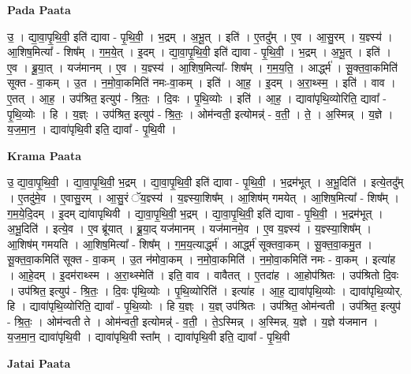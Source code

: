\documentclass[17pt]{extarticle}
\begin{document}
\textbf{Pada Paata} \newline

उ॒ । द्या॒वा॒पृ॒थि॒वी॒ इति॑ द्यावा - पृ॒थि॒वी॒ । भ॒द्रम् । अ॒भू॒त् । इति॑ । ए॒तदु᳚म् । ए॒व । आ॒सु॒रम् । य॒ज्ञ्स्य॑ । आ॒शिष॒मित्या᳚ - शिष᳚म् । ग॒म॒ये॒त् । इ॒दम् । द्या॒वा॒पृ॒थि॒वी॒ इति॑ द्यावा - पृ॒थि॒वी॒ । भ॒द्रम् । अ॒भू॒त् । इति॑ । ए॒व । ब्रू॒या॒त् । यज॑मानम् । ए॒व । य॒ज्ञ्स्य॑ । आ॒शिष॒मित्या᳚- शिष᳚म् । ग॒म॒य॒ति॒ । आर्द्ध्म॑ । सू॒क्त॒वा॒कमिति॑ सूक्त - वा॒कम् । उ॒त । न॒मो॒वा॒कमिति॑ नमः-वा॒कम् । इति॑ । आ॒ह॒ । इ॒दम् । अ॒रा॒थ्स्म॒ । इति॑ । वाव । ए॒तत् । आ॒ह॒ । उप॑श्रित॒ इत्युप॑ - श्रि॒तः॒ । दि॒वः । पृ॒थि॒व्योः । इति॑ । आ॒ह॒ । द्यावा॑पृथि॒व्योरिति॒ द्यावा᳚ - पृ॒थि॒व्योः । हि । य॒ज्ञ्ः । उप॑श्रित॒ इत्युप॑ - श्रि॒तः॒ । ओम॑न्वती॒ इत्योमन्न्॑ - व॒ती॒ । ते॒ । अ॒स्मिन्न् । य॒ज्ञे । य॒ज॒मा॒न॒ । द्यावा॑पृथि॒वी इति॒ द्यावा᳚ - पृ॒थि॒वी ।  \newline


\textbf{Krama Paata} \newline

उ॒ द्या॒वा॒पृ॒थि॒वी॒ । द्या॒वा॒पृ॒थि॒वी॒ भ॒द्रम् । द्या॒वा॒पृ॒थि॒वी॒ इति॑ द्यावा - पृ॒थि॒वी॒ । भ॒द्रम॑भूत् । अ॒भू॒दिति॑ । इत्ये॒तदु᳚म् । ए॒तदु॑मे॒व । ए॒वासु॒रम् । आ॒सु॒रं ॅय॒ज्ञ्स्य॑ । य॒ज्ञ्स्या॒शिष᳚म् । आ॒शिष॑म् गमयेत् । आ॒शिष॒मित्या᳚ - शिष᳚म् । ग॒म॒ये॒दि॒दम् । इ॒दम् द्या॑वापृथिवी । द्या॒वा॒पृ॒थि॒वी॒ भ॒द्रम् । द्या॒वा॒पृ॒थि॒वी॒ इति॑ द्यावा - पृ॒थि॒वी॒ । भ॒द्रम॑भूत् । अ॒भू॒दिति॑ । इत्ये॒व । ए॒व ब्रू॑यात् । ब्रू॒या॒द् यज॑मानम् । यज॑मानमे॒व । ए॒व य॒ज्ञ्स्य॑ । य॒ज्ञ्स्या॒शिष᳚म् । आ॒शिष॑म् गमयति । आ॒शिष॒मित्या᳚ - शिष᳚म् । ग॒म॒य॒त्यार्द्ध्म॑ । आर्द्ध्म॑ सूक्तवा॒कम् । सू॒क्त॒वा॒कमु॒त । सू॒क्त॒वा॒कमिति॑ सूक्त - वा॒कम् । उ॒त न॑मोवा॒कम् । न॒मो॒वा॒कमिति॑ । न॒मो॒वा॒कमिति॑ नमः - वा॒कम् । इत्या॑ह । आ॒हे॒दम् । इ॒दम॑राथ्स्म । अ॒रा॒थ्स्मेति॑ । इति॒ वाव । वावैतत् । ए॒तदा॑ह । आ॒होप॑श्रितः । उप॑श्रितो दि॒वः । उप॑श्रित॒ इत्युप॑ - श्रि॒तः॒ । दि॒वः पृ॑थि॒व्योः । पृ॒थि॒व्योरिति॑ । इत्या॑ह । आ॒ह॒ द्यावा॑पृथि॒व्योः । द्यावा॑पृथि॒व्योर्. हि । द्यावा॑पृथि॒व्योरिति॒ द्यावा᳚ - पृ॒थि॒व्योः । हि य॒ज्ञ्ः । य॒ज्ञ् उप॑श्रितः । उप॑श्रित॒ ओम॑न्वती । उप॑श्रित॒ इत्युप॑ - श्रि॒तः॒ । ओम॑न्वती ते । ओम॑न्वती॒ इत्योमन्न्॑ - व॒ती॒ । ते॒ऽस्मिन्न् । अ॒स्मिन्न्. य॒ज्ञे । य॒ज्ञे य॑जमान । य॒ज॒मा॒न॒ द्यावा॑पृथि॒वी । द्यावा॑पृथि॒वी स्ता᳚म् । द्यावा॑पृथि॒वी इति॒ द्यावा᳚ - पृ॒थि॒वी \newline

\textbf{Jatai Paata} \newline
\end{document}
